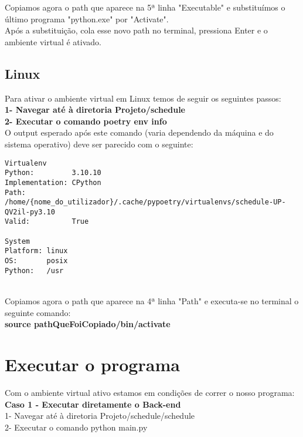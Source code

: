 \documentclass[11pt,a4paper]{report}
\begin{document}
Copiamos agora o path que aparece na 5ª linha "Executable" e substituímos o último programa "python.exe" por "Activate". \\

Após a substituição, cola esse novo path no terminal, pressiona Enter e o ambiente virtual é ativado. \\

\subsection{Linux}
Para ativar o ambiente virtual em Linux temos de seguir os seguintes passos: \\

\textbf{1- Navegar até à diretoria Projeto/schedule}\\ 

\textbf{2- Executar o comando poetry env info}\\
O output esperado após este comando (varia dependendo da máquina e do sistema operativo) deve ser parecido com o seguinte:  \\

\begin{verbatim}
Virtualenv
Python:         3.10.10
Implementation: CPython
Path:           /home/{nome_do_utilizador}/.cache/pypoetry/virtualenvs/schedule-UP-QV2il-py3.10
Valid:          True

System
Platform: linux
OS:       posix
Python:   /usr
\end{verbatim} \\ 

Copiamos agora o path que aparece na 4ª linha "Path" e executa-se no terminal o seguinte comando:  \\
\textbf{source pathQueFoiCopiado/bin/activate}  \\



\section{Executar o programa}
Com o ambiente virtual ativo estamos em condições de correr o nosso programa: \\

\textbf{Caso 1 - Executar diretamente o Back-end} \\

1- Navegar até à diretoria Projeto/schedule/schedule \\ 

2- Executar o comando python main.py
\end{document}

